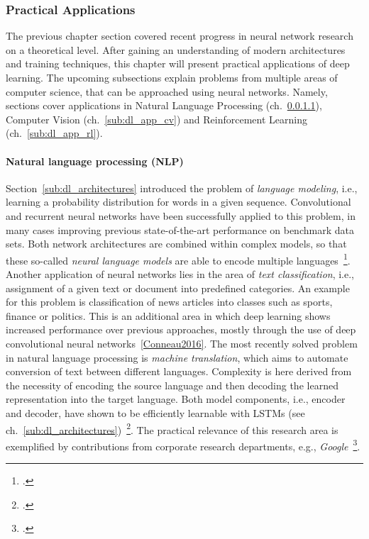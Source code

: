 \subsubsection{Practical Applications}
\label{sub:dl_applications}

The previous chapter section covered recent progress in neural network research
on a theoretical level.
After gaining an understanding of modern architectures and training techniques,
this chapter will present practical applications of deep learning.
The upcoming subsections explain problems from multiple areas of computer
science, that can be approached using neural networks.
Namely, sections cover applications in Natural Language Processing (ch.~\ref{sub:dl_app_nlp}),
Computer Vision (ch.~\ref{sub:dl_app_cv}) and Reinforcement Learning (ch.~\ref{sub:dl_app_rl}).

\paragraph{Natural language processing (NLP)}
\label{sub:dl_app_nlp}

Section~\ref{sub:dl_architectures} introduced the problem of \textit{language modeling},
i.e., learning a probability distribution for words in a given sequence.
Convolutional and recurrent neural networks have been successfully applied to
this problem, in many cases improving previous state-of-the-art performance
on benchmark data sets.
Both network architectures are combined within complex models, so that these
so-called \textit{neural language models} are able to encode multiple
languages~\footcite{Kim2015}.
Another application of neural networks lies in the area of \textit{text classification},
i.e., assignment of a given text or document into predefined categories.
An example for this problem is classification of news articles into classes such
as sports, finance or politics.
This is an additional area in which deep learning shows increased performance
over previous approaches, mostly through the use of deep convolutional neural
networks~\ref{Conneau2016}.
The most recently solved problem in natural language processing is \textit{machine
translation}, which aims to automate conversion of text between different
languages.
Complexity is here derived from the necessity of encoding the source language and
then decoding the learned representation into the target language.
Both model components, i.e., encoder and decoder, have shown to be efficiently
learnable with LSTMs (see ch.~\ref{sub:dl_architectures})~\footcite{Sutskever2014}.
The practical relevance of this research area is exemplified by contributions
from corporate research departments, e.g., \textit{Google}~\footcite{Wu2016}.


